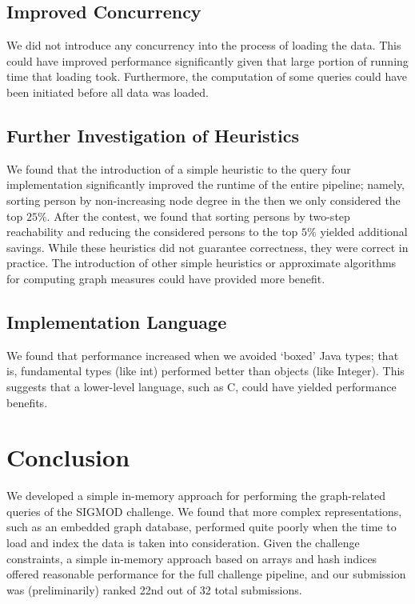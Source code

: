 \documentclass{article}
\begin{document}
\subsection{Improved Concurrency}
We did not introduce any concurrency into the process of loading the
data.  This could have improved performance significantly given that
large portion of running time that loading took.  Furthermore, the
computation of some queries could have been initiated before all data
was loaded.

\subsection{Further Investigation of Heuristics}
We found that the introduction of a simple heuristic to the query four
implementation significantly improved the runtime of the entire
pipeline; namely, sorting person by non-increasing node degree in the
then we only considered the top $25\%$.  After the contest, we found
that sorting persons by two-step reachability and reducing the
considered persons to the top $5\%$ yielded additional savings.  While
these heuristics did not guarantee correctness, they were correct in
practice.  The introduction of other simple heuristics or approximate algorithms for 
computing graph measures could have provided more benefit.

\subsection{Implementation Language}
We found that performance increased when we avoided `boxed' Java
types; that is, fundamental types (like int) performed better than
objects (like Integer).  This suggests that a lower-level language,
such as C, could have yielded performance benefits.

\section{Conclusion}
We developed a simple in-memory approach for performing the
graph-related queries of the SIGMOD challenge.  We found that more
complex representations, such as an embedded graph database, performed
quite poorly when the time to load and index the data is taken into
consideration.  Given the challenge constraints, a simple in-memory
approach based on arrays and hash indices offered reasonable
performance for the full challenge pipeline, and our submission was
(preliminarily) ranked 22nd out of 32 total submissions.
\end{document}
